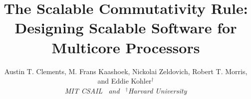 
\title{\bf The Scalable Commutativity Rule: \\ Designing Scalable Software for
  Multicore Processors}
\author{Austin T. Clements, M. Frans Kaashoek, Nickolai Zeldovich, Robert T. Morris, and Eddie Kohler$^\dag$ \\
        {\em MIT CSAIL ~and~ $^\dag$Harvard University}}
\date{}

\maketitle
